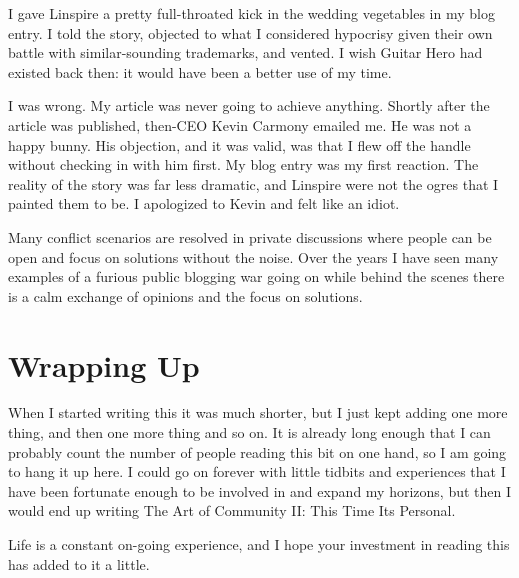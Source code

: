 I gave Linspire a pretty full-throated kick in the wedding vegetables in my blog entry. I told the story, objected to what I considered hypocrisy given their own battle with similar-sounding trademarks, and vented. I wish Guitar Hero had existed back then: it would have been a better use of my time.

I was wrong. My article was never going to achieve anything. Shortly after the article was published, then-CEO Kevin Carmony emailed me. He was not a happy bunny. His objection, and it was valid, was that I flew off the handle without checking in with him first. My blog entry was my first reaction. The reality of the story was far less dramatic, and Linspire were not the ogres that I painted them to be. I apologized to Kevin and felt like an idiot.

Many conflict scenarios are resolved in private discussions where people can be open and focus on solutions without the noise. Over the years I have seen many examples of a furious public blogging war going on while behind the scenes there is a calm exchange of opinions and the focus on solutions.

\section*{Wrapping Up}

When I started writing this it was much shorter, but I just kept adding one more thing, and then one more thing and so on. It is already long enough that I can probably count the number of people reading this bit on one hand, so I am going to hang it up here. I could go on forever with little tidbits and experiences that I have been fortunate enough to be involved in and expand my horizons, but then I would end up writing The Art of Community II: This Time Its Personal.

Life is a constant on-going experience, and I hope your investment in reading this has added to it a little.

